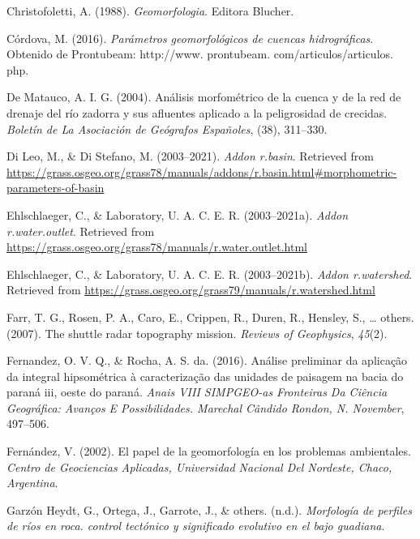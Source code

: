 \documentclass[11pt,]{article}
\begin{document}
\hypertarget{ref-christofoletti1988geomorfologia}{}
Christofoletti, A. (1988). \emph{Geomorfologia}. Editora Blucher.

\hypertarget{ref-cordova2016parametros}{}
Córdova, M. (2016). \emph{Parámetros geomorfológicos de cuencas
hidrográficas}. Obtenido de Prontubeam: http://www. prontubeam.
com/articulos/articulos. php.

\hypertarget{ref-de2004analisis}{}
De Matauco, A. I. G. (2004). Análisis morfométrico de la cuenca y de la
red de drenaje del río zadorra y sus afluentes aplicado a la
peligrosidad de crecidas. \emph{Boletín de La Asociación de Geógrafos
Españoles}, (38), 311--330.

\hypertarget{ref-basinmargherita}{}
Di Leo, M., \& Di Stefano, M. (2003--2021). \emph{Addon r.basin}.
Retrieved from
\url{https://grass.osgeo.org/grass78/manuals/addons/r.basin.html\#morphometric-parameters-of-basin}

\hypertarget{ref-wateroutlet}{}
Ehlschlaeger, C., \& Laboratory, U. A. C. E. R. (2003--2021a).
\emph{Addon r.water.outlet}. Retrieved from
\url{https://grass.osgeo.org/grass78/manuals/r.water.outlet.html}

\hypertarget{ref-watershedcharles}{}
Ehlschlaeger, C., \& Laboratory, U. A. C. E. R. (2003--2021b).
\emph{Addon r.watershed}. Retrieved from
\url{https://grass.osgeo.org/grass79/manuals/r.watershed.html}

\hypertarget{ref-farr2007shuttle}{}
Farr, T. G., Rosen, P. A., Caro, E., Crippen, R., Duren, R., Hensley,
S., \ldots{} others. (2007). The shuttle radar topography mission.
\emph{Reviews of Geophysics}, \emph{45}(2).

\hypertarget{ref-fernandez2016analise}{}
Fernandez, O. V. Q., \& Rocha, A. S. da. (2016). Análise preliminar da
aplicação da integral hipsométrica à caracterização das unidades de
paisagem na bacia do paraná iii, oeste do paraná. \emph{Anais VIII
SIMPGEO-as Fronteiras Da Ciência Geográfica: Avanços E Possibilidades.
Marechal Cândido Rondon, N. November}, 497--506.

\hypertarget{ref-fernandez2002papel}{}
Fernández, V. (2002). El papel de la geomorfología en los problemas
ambientales. \emph{Centro de Geociencias Aplicadas, Universidad Nacional
Del Nordeste, Chaco, Argentina}.

\hypertarget{ref-garzonmorfologia}{}
Garzón Heydt, G., Ortega, J., Garrote, J., \& others. (n.d.).
\emph{Morfología de perfiles de ríos en roca. control tectónico y
significado evolutivo en el bajo guadiana}.
\end{document}
